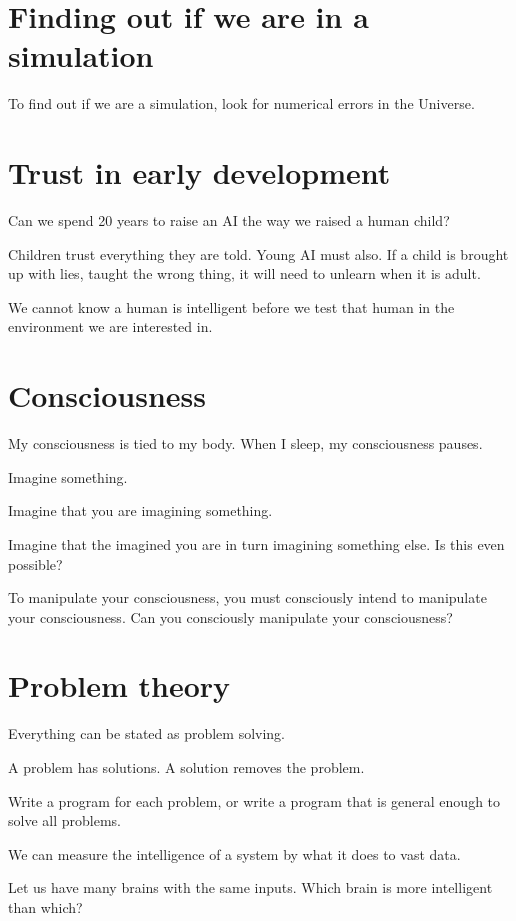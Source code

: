 \section{Finding out if we are in a simulation}

To find out if we are a simulation,
look for numerical errors in the Universe.
\cite{UniNumError}

\section{Trust in early development}

Can we spend 20 years to raise an AI the way we raised a human child?

Children trust everything they are told.
Young AI must also.
If a child is brought up with lies, taught the wrong thing,
it will need to unlearn when it is adult.

We cannot know a human is intelligent before we test
that human in the environment we are interested in.

\section{Consciousness}

My consciousness is tied to my body.
When I sleep, my consciousness pauses.

Imagine something.

Imagine that you are imagining something.

Imagine that the imagined you are in turn imagining something else.
Is this even possible?

To manipulate your consciousness,
you must consciously intend to manipulate your consciousness.
Can you consciously manipulate your consciousness?

\section{Problem theory}

Everything can be stated as problem solving.

A problem has solutions.
A solution removes the problem.

Write a program for each problem,
or write a program that is general enough to solve all problems.

We can measure the intelligence of a system by what it does to vast data.

Let us have many brains with the same inputs.
Which brain is more intelligent than which?


